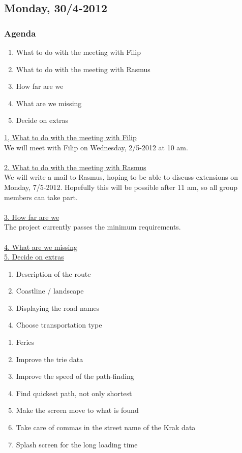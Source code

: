 \documentclass[a4paper,11pt]{article}
\begin{document}
\pagebreak
\subsection{Monday, 30/4-2012}

\subsubsection*{Agenda}
\begin{enumerate}
	\item What to do with the meeting with Filip
	\item What to do with the meeting with Rasmus
	\item How far are we
	\item What are we missing
	\item Decide on extras
\end{enumerate}
\underline{1, What to do with the meeting with Filip} \\
We will meet with Filip on Wednesday, 2/5-2012 at 10 am. \\ \\
\underline{2. What to do with the meeting with Rasmus} \\
We will write a mail to Rasmus, hoping to be able to discuss extensions on Monday, 7/5-2012. Hopefully this will be possible after 11 am, so all group members can take part. \\ \\
\underline{3. How far are we} \\
The project currently passes the minimum requirements. \\ \\
\underline{4. What are we missing} \\

\underline{5. Decide on extras}
\begin{enumerate}
	\item Description of the route
	\item Coastline / landscape
	\item Displaying the road names
	\item Choose transportation type
\end{enumerate}

\begin{enumerate}
	\item Feries
	\item Improve the trie data
	\item Improve the speed of the path-finding
	\item Find quickest path, not only shortest
	\item Make the screen move to what is found
	\item Take care of commas in the street name of the Krak data
	\item Splash screen for the long loading time
\end{enumerate}
\end{document}
